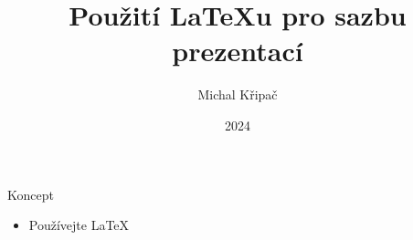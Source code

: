 \documentclass{beamer}
\title{Použití \LaTeX u pro sazbu prezentací}
\date{2024}
\author{Michal Křipač}
\begin{document}
\begin{frame}
    \titlepage
\end{frame}

\begin{frame}{Koncept}
    \begin{itemize}
        \item Používejte \LaTeX
    \end{itemize}
\end{frame}

\begin{frame}
\end{frame}
\end{document}
